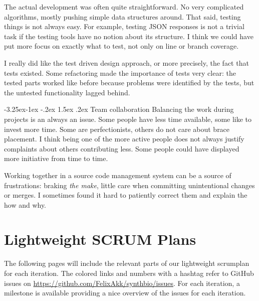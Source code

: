 \documentclass[a4paper]{article}
\makeatletter
\renewcommand\paragraph{\@startsection{paragraph}{4}{\z@}%
  {-3.25ex\@plus -1ex \@minus -.2ex}%
  {1.5ex \@plus .2ex}%
  {\normalfont\normalsize\bfseries}}
\makeatother
\begin{document}
The actual development was often quite straightforward. No very complicated algorithms, mostly pushing simple data structures around. That said, testing things is not always easy. For example, testing JSON responses is not a trivial task if the testing tools have no notion about its structure. I think we could have put more focus on exactly what to test, not only on line or branch coverage.

I really did like the test driven design approach, or more precisely, the fact that tests existed. Some refactoring made the importance of tests very clear: the tested parts worked like before because problems were identified by the tests, but the untested functionality lagged behind.

\paragraph{Team collaboration}
Balancing the work during projects is an always an issue. Some people have less time available, some like to invest more time. Some are perfectionists, others do not care about brace placement. I think being one of the more active people does not always justify complaints about others contributing less. Some people could have displayed more initiative from time to time.

Working together in a source code management system can be a source of frustrations: braking \textit{the make}, little care when committing unintentional changes or merges. I sometimes found it hard to patiently correct them and explain the how and why.




\appendix

\section{Lightweight SCRUM Plans}
\label{scrumplans}
The following pages will include the relevant parts of our lightweight scrumplan for each iteration. The colored links and numbers with a hashtag refer to GitHub issues on \url{https://github.com/FelixAkk/synthbio/issues}. For each iteration, a milestone is available providing a nice overview of the issues for each iteration.
\end{document}
